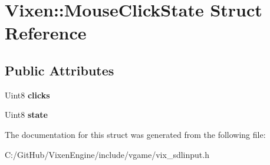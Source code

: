 \hypertarget{struct_vixen_1_1_mouse_click_state}{}\section{Vixen\+:\+:Mouse\+Click\+State Struct Reference}
\label{struct_vixen_1_1_mouse_click_state}
\subsection*{Public Attributes}
\begin{DoxyCompactItemize}
\item 
\hypertarget{struct_vixen_1_1_mouse_click_state_abfb318bddc6cc2e18bfbbe878f1858d4}{}Uint8 {\bfseries clicks}\label{struct_vixen_1_1_mouse_click_state_abfb318bddc6cc2e18bfbbe878f1858d4}

\item 
\hypertarget{struct_vixen_1_1_mouse_click_state_ab1215d9225dfb93f7e2484e5cebbb92c}{}Uint8 {\bfseries state}\label{struct_vixen_1_1_mouse_click_state_ab1215d9225dfb93f7e2484e5cebbb92c}

\end{DoxyCompactItemize}


The documentation for this struct was generated from the following file\+:\begin{DoxyCompactItemize}
\item 
C\+:/\+Git\+Hub/\+Vixen\+Engine/include/vgame/vix\+\_\+sdlinput.\+h\end{DoxyCompactItemize}
